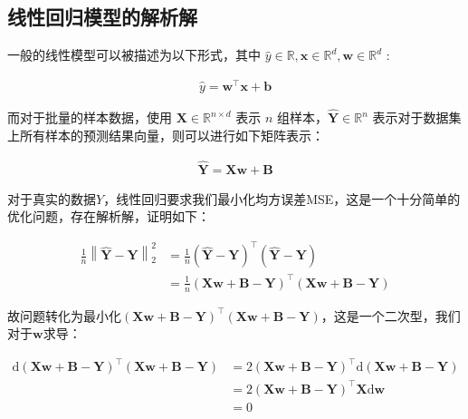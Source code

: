 \documentclass[UTF8]{book}
\begin{document}
\subsection{线性回归模型的解析解}
一般的线性模型可以被描述为以下形式，其中 $\hat{y}\in \mathbb{R}, \mathbf{x}\in \mathbb{R}^d, \mathbf{w}\in \mathbb{R}^d$ :
\begin{large}
    \begin{equation}
        \begin{aligned}
            \hat{y}= \mathbf{w}^\top \mathbf{x}+\mathbf{b}
            \nonumber
        \end{aligned}
    \end{equation}
\end{large}
而对于批量的样本数据，使用 $\mathbf{X}\in \mathbb{R}^{n\times d}$ 表示 $n$ 组样本，$\hat{\mathbf{Y}}\in \mathbb{R}^{n}$ 表示对于数据集上所有样本的预测结果向量，则可以进行如下矩阵表示：
\begin{large}
    \begin{equation}
        \begin{aligned}
            \hat{\mathbf{Y}}=\mathbf{X}\mathbf{w}+\mathbf{B}
            \nonumber
        \end{aligned}
    \end{equation}
\end{large}
对于真实的数据$Y$，线性回归要求我们最小化均方误差MSE，这是一个十分简单的优化问题，存在解析解，证明如下：
\begin{large}
    \begin{equation}
        \begin{aligned}
            \frac{1}{n}\left \| \hat{\mathbf{Y}}-\mathbf{Y} \right \|_2^2 &= \frac{1}{n}(\hat{\mathbf{Y}}-\mathbf{Y})^\top(\hat{\mathbf{Y}}-\mathbf{Y}) \\
            &= \frac{1}{n}(\mathbf{X}\mathbf{w}+\mathbf{B}-\mathbf{Y})^\top(\mathbf{X}\mathbf{w}+\mathbf{B}-\mathbf{Y})
            \nonumber
        \end{aligned}
    \end{equation}
\end{large}
故问题转化为最小化$(\mathbf{X}\mathbf{w}+\mathbf{B}-\mathbf{Y})^\top(\mathbf{X}\mathbf{w}+\mathbf{B}-\mathbf{Y})$，这是一个二次型，我们对于$\mathbf{w}$求导：
\begin{large}
    \begin{equation}
        \begin{aligned}
            \mathrm{d}(\mathbf{X}\mathbf{w}+\mathbf{B}-\mathbf{Y})^\top(\mathbf{X}\mathbf{w}+\mathbf{B}-\mathbf{Y}) &= 2(\mathbf{X}\mathbf{w}+\mathbf{B}-\mathbf{Y})^\top\mathrm{d}(\mathbf{X}\mathbf{w}+\mathbf{B}-\mathbf{Y}) \\
            &= 2(\mathbf{X}\mathbf{w}+\mathbf{B}-\mathbf{Y})^\top\mathbf{X}\mathrm{d}\mathbf{w} \\
            &= 0
            \nonumber
        \end{aligned}
    \end{equation}
\end{large}
\end{document}
